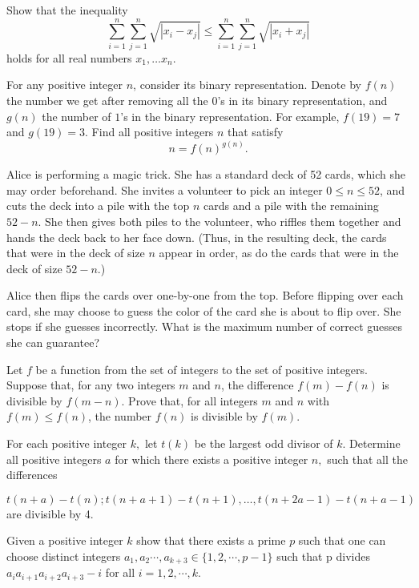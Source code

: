 \documentclass[11pt]{scrartcl}
\begin{document}
\begin{problem}[952584318797289]
Show that the inequality\[\sum_{i=1}^n \sum_{j=1}^n \sqrt{|x_i-x_j|}\leqslant \sum_{i=1}^n \sum_{j=1}^n \sqrt{|x_i+x_j|}\]holds for all real numbers $x_1,\ldots x_n.$
\end{problem}
\begin{problem}[956334431352435]
For any positive integer $n$, consider its binary representation. Denote by $f(n)$ the number we get after removing all the $0$'s in its binary representation, and $g(n)$ the number of $1$'s in the binary representation. For example, $f(19) = 7$ and $g(19) = 3.$
Find all positive integers $n$ that satisfy
$$n = f(n)^{g(n)}.$$
\end{problem}
\begin{problem}[958328158026487]
Alice is performing a magic trick. She has a standard deck of 52 cards, which she may order beforehand. She invites a volunteer to pick an integer \(0\le n\le 52\), and cuts the deck into a pile with the top \(n\) cards and a pile with the remaining \(52-n\). She then gives both piles to the volunteer, who riffles them together and hands the deck back to her face down. (Thus, in the resulting deck, the cards that were in the deck of size \(n\) appear in order, as do the cards that were in the deck of size \(52-n\).)

Alice then flips the cards over one-by-one from the top. Before flipping over each card, she may choose to guess the color of the card she is about to flip over. She stops if she guesses incorrectly. What is the maximum number of correct guesses she can guarantee?
\end{problem}
\begin{problem}[958427699872884]
Let $f$ be a function from the set of integers to the set of positive integers. Suppose that, for any two integers $m$ and $n$, the difference $f(m) - f(n)$ is divisible by $f(m- n)$. Prove that, for all integers $m$ and $n$ with $f(m) \leq f(n)$, the number $f(n)$ is divisible by $f(m)$.
\end{problem}
\begin{problem}[960400012939961]
For each positive integer $k,$ let $t(k)$ be the largest odd divisor of $k.$ Determine all positive integers $a$ for which there exists a positive integer $n,$ such that all the differences

\[t(n+a)-t(n); t(n+a+1)-t(n+1), \ldots, t(n+2a-1)-t(n+a-1)\]are divisible by 4.
\end{problem}
\begin{problem}[961350373727093]
Given a positive integer $k$ show that there exists a prime $p$ such that one can choose distinct integers $a_1,a_2\cdots, a_{k+3} \in \{1, 2, \cdots ,p-1\}$ such that p divides $a_ia_{i+1}a_{i+2}a_{i+3}-i$ for all $i= 1, 2, \cdots, k$.
\end{problem}
\end{document}
